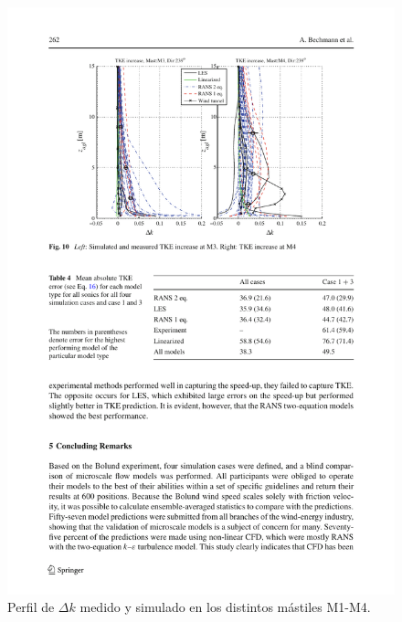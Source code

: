 \begin{figure}[H]
	\includegraphics[width=1\linewidth,trim={2.7cm 14.3cm 1.9cm 2cm},clip]{bolund5.pdf}%
	\caption{Perfil de $\Delta k$ medido y simulado en los distintos mástiles M1-M4.}
	\label{fig:an1_delta_tke_mast}
\end{figure}
\vspace*{\fill}